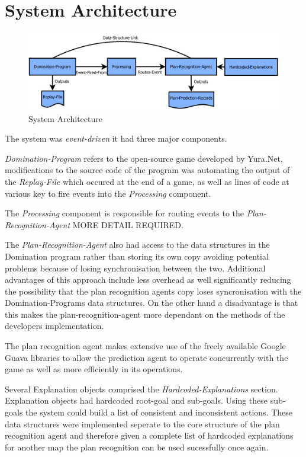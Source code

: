 \documentclass[parskip]{cs4rep}
\begin{document}
\section{System Architecture}

\begin{figure}[h]
\centerline{
\includegraphics[width=1.2\textwidth]{images/system-architecture}
}
\caption{System Architecture}
\end{figure} 

The system was \textit{event-driven} it had three major components.

\textit{Domination-Program} refers to the open-source game developed by Yura.Net, modifications to the source code of the program was automating the output of the \textit{Replay-File} which occured at the end of a game, as well as lines of code at various key to fire events into the \textit{Processing} component. 

The \textit{Processing} component is responsible for routing events to the \textit{Plan-Recognition-Agent} MORE DETAIL REQUIRED.

The \textit{Plan-Recognition-Agent} also had access to the data structures in the Domination program rather than storing its own copy avoiding potential problems because of losing synchronisation between the two. Additional advantages of this approach include less overhead as well significantly reducing the possibility that the plan recognition agents copy loses syncronisation with the Domination-Programs data structures. On the other hand a disadvantage is that this makes the plan-recognition-agent more dependant on the methods of the developers implementation.

The plan recognition agent makes extensive use of the freely available Google Guava libraries to allow the prediction agent to operate concurrently with the game as well as more efficiently in its operations.

Several Explanation objects comprised the \textit{Hardcoded-Explanations} section. Explanation objects had hardcoded root-goal and sub-goals. Using these sub-goals the system could build a list of consistent and inconsistent actions. These data structures were implemented seperate to the core structure of the plan recognition agent and therefore given a complete list of hardcoded explanations for another map the plan recognition can be used sucessfully once again.
\end{document}
